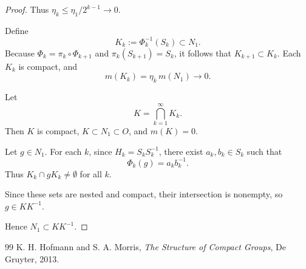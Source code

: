 \documentclass[10pt,a4paper]{amsart}
\begin{document}
\begin{proof}
Thus \(\eta_k \le \eta_1 / 2^{k-1} \to 0\).

Define
\[
K_k := \Phi_k^{-1}(S_k) \subset N_1.
\]
Because \(\Phi_k = \pi_k \circ \Phi_{k+1}\) and \(\pi_k(S_{k+1}) = S_k\), it follows that \(K_{k+1} \subset K_k\). Each \(K_k\) is compact, and
\[
m(K_k) = \eta_k\, m(N_1) \to 0.
\]

Let
\[
K = \bigcap_{k=1}^\infty K_k.
\]
Then \(K\) is compact, \(K \subset N_1 \subset O\), and \(m(K)=0\).

Let \(g \in N_1\). For each \(k\), since \(H_k = S_k S_k^{-1}\),
there exist \(a_k, b_k \in S_k\) such that
\[
\Phi_k(g) = a_k b_k^{-1}.
\]
Thus \(K_k \cap gK_k \neq \emptyset\) for all \(k\).

Since these sets are nested and compact, their intersection is nonempty,
so \(g \in KK^{-1}\).

Hence \(N_1 \subset KK^{-1}\).
\end{proof}

\begin{thebibliography}{99}
 K. H. Hofmann and S. A. Morris, \textit{The Structure of Compact Groups}, De Gruyter, 2013.
\end{thebibliography}
\end{document}
